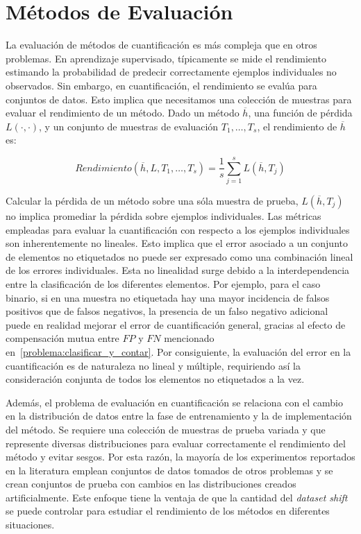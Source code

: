 \chapter{Métodos de Evaluación}\label{evaluacion}

La evaluación de métodos de cuantificación es más compleja que en otros
problemas. En aprendizaje supervisado, típicamente se mide el rendimiento
estimando la probabilidad de predecir correctamente ejemplos individuales no
observados. Sin embargo, en cuantificación, el rendimiento se evalúa para
conjuntos de datos. Esto implica que necesitamos una colección de muestras para
evaluar el rendimiento de un método. Dado un método $\overline{h}$, una función
de pérdida $L(\cdot, \cdot)$, y un conjunto de muestras de evaluación ${T_1,
\dots, T_s}$, el rendimiento de $\overline{h}$ es:

\begin{equation}
    Rendimiento(\overline{h}, L, {T_1, \dots , T_s}) = \frac{1}{s}
    \sum \limits_{j=1}^{s}L(\overline{h}, T_j)
    \label{ecuacion_rendimiento}
\end{equation}

Calcular la pérdida de un método sobre una sóla muestra de prueba,
$L(\overline{h}, T_j)$ no implica promediar la pérdida sobre ejemplos
individuales. Las métricas empleadas para evaluar la cuantificación con respecto
a los ejemplos individuales son inherentemente no lineales. Esto implica que el
error asociado a un conjunto de elementos no etiquetados no puede ser expresado
como una combinación lineal de los errores individuales. Esta no linealidad
surge debido a la interdependencia entre la clasificación de los diferentes
elementos. Por ejemplo, para el caso binario, si en una muestra no etiquetada
hay una mayor incidencia de falsos positivos que de falsos negativos, la
presencia de un falso negativo adicional puede en realidad mejorar el error de
cuantificación general, gracias al efecto de compensación mutua entre $FP$ y
$FN$ mencionado en~\ref{problema:clasificar_y_contar}. Por consiguiente, la
evaluación del error en la cuantificación es de naturaleza no lineal y múltiple,
requiriendo así la consideración conjunta de todos los elementos no etiquetados
a la vez.

Además, el problema de evaluación en cuantificación se relaciona con el cambio
en la distribución de datos entre la fase de entrenamiento y la de
implementación del método. Se requiere una colección de muestras de prueba
variada y que represente diversas distribuciones para evaluar correctamente el
rendimiento del método y evitar sesgos. Por esta razón, la mayoría de los
experimentos reportados en la literatura emplean conjuntos de datos tomados de
otros problemas y se crean conjuntos de prueba con cambios en las distribuciones
creados artificialmente. Este enfoque tiene la ventaja de que la cantidad del
{\it dataset shift\/} se puede controlar para estudiar el rendimiento de los
métodos en diferentes situaciones.

